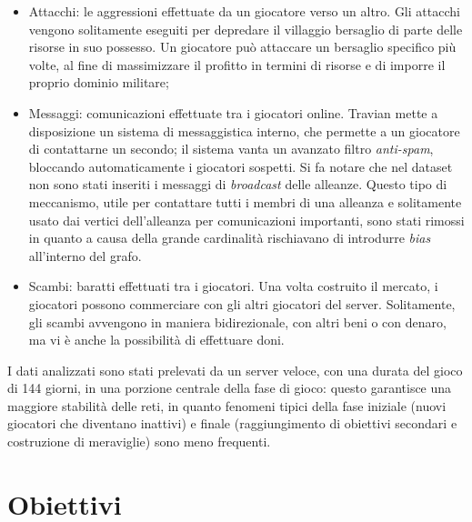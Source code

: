 \begin{itemize}
	\item Attacchi: le aggressioni effettuate da un giocatore verso un altro. Gli attacchi vengono solitamente eseguiti per depredare il villaggio bersaglio di parte delle risorse in suo possesso. Un giocatore può attaccare un bersaglio specifico più volte, al fine di massimizzare il profitto in termini di risorse e di imporre il proprio dominio militare;
	\item Messaggi: comunicazioni effettuate tra i giocatori online. Travian mette a disposizione un sistema di messaggistica interno, che permette a un giocatore di contattarne un secondo; il sistema vanta un avanzato filtro \textit{anti-spam}, bloccando automaticamente i giocatori sospetti.
	Si fa notare che nel dataset non sono stati inseriti i messaggi di \textit{broadcast} delle alleanze. Questo tipo di meccanismo, utile per contattare tutti i membri di una alleanza e solitamente usato dai vertici dell'alleanza per comunicazioni importanti, sono stati rimossi in quanto a causa della grande cardinalità rischiavano di introdurre \textit{bias} all'interno del grafo.
	\item Scambi: baratti effettuati tra i giocatori. Una volta costruito il mercato, i giocatori possono commerciare con gli altri giocatori del server. Solitamente, gli scambi avvengono in maniera bidirezionale, con altri beni o con denaro, ma vi è anche la possibilità di effettuare doni.
\end{itemize}
I dati analizzati sono stati prelevati da un server veloce, con una durata del gioco di 144 giorni, in una porzione centrale della fase di gioco: questo garantisce una maggiore stabilità delle reti, in quanto fenomeni tipici della fase iniziale (nuovi giocatori che diventano inattivi) e finale (raggiungimento di obiettivi secondari e costruzione di meraviglie) sono meno frequenti.

\section{Obiettivi}
